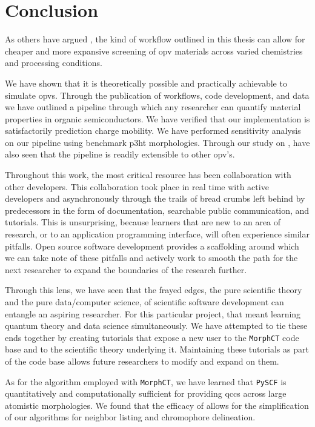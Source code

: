 \chapter{Conclusion}
\label{conclusion}

As others have argued \cite{Evans2016}\cite{Gali2017}\cite{Jones2017}, the kind of workflow outlined in this thesis
can allow for cheaper and more expansive screening of \gls{opv} materials across varied chemistries and processing
conditions. 

We have shown that it is theoretically possible and practically
achievable to simulate \gls{opv}s. 
Through the publication
of workflows, code development, and data we have outlined a 
pipeline through which any researcher can quantify material properties in
organic semiconductors. We have verified that our implementation is satisfactorily prediction charge mobility. We have performed sensitivity analysis on our pipeline using benchmark
\gls{p3ht} morphologies. Through our study on ,  have also seen that the pipeline is readily
extensible to other \gls{opv}'s.

Throughout this work, the most critical resource has been collaboration with
other developers. This collaboration took place in real time with active
developers and asynchronously through the trails of bread crumbs left behind
by predecessors in the form of documentation, searchable public communication,
and tutorials. This is unsurprising, because learners that are new to an area
of research, or to an application programming interface, will often experience
similar pitfalls. Open source software development provides a scaffolding
around which we can take note of these pitfalls and actively work to smooth the 
path for the next
researcher to expand the boundaries of the research further.

Through this lens, we have seen that the frayed edges, the pure
scientific theory and the pure data/computer science, of scientific software
development can entangle an aspiring researcher. For this particular project,
that meant learning quantum theory and data science simultaneously. We have
attempted to tie these ends together by creating tutorials that expose a new
user to the \texttt{MorphCT} code base and to the scientific theory
underlying it. Maintaining these tutorials as part of the code base allows
future researchers to modify and expand on them. 

As for the algorithm employed with \texttt{MorphCT}, we have learned that
\texttt{PySCF} is quantitatively and computationally sufficient for providing
\gls{qcc}s across large atomistic morphologies. We found that the efficacy of
 allows for the simplification of our algorithms for neighbor
listing and chromophore delineation.  

